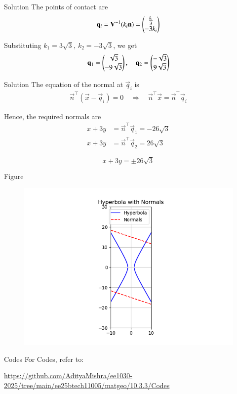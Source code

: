 \documentclass{beamer}
\begin{document}
\begin{frame}{Solution}
The points of contact are
\begin{align}
\mathbf{q}_i = \mathbf{V}^{-1} (k_i \mathbf{n})
= \begin{pmatrix}\tfrac{k_i}{3} \\ -3 k_i\end{pmatrix}
\end{align}

Substituting $k_1 = 3\sqrt{3},\ k_2 = -3\sqrt{3}$, we get
\begin{align}
\mathbf{q}_1 = \begin{pmatrix}\sqrt{3} \\ -9\sqrt{3}\end{pmatrix}, \quad
\mathbf{q}_2 = \begin{pmatrix}-\sqrt{3} \\ 9\sqrt{3}\end{pmatrix}
\end{align}
\end{frame}

\begin{frame}{Solution}
The equation of the normal at $\vec{q}_i$ is
\begin{align}
\vec{n}^\top (\vec{x} - \vec{q}_i) = 0
\quad \Rightarrow \quad
\vec{n}^\top \vec{x} = \vec{n}^\top \vec{q}_i
\end{align}

Hence, the required normals are
\begin{align}
x + 3y &= \vec{n}^\top \vec{q}_1 = -26\sqrt{3} \\
x + 3y &= \vec{n}^\top \vec{q}_2 = 26\sqrt{3}
\end{align}

\[
\boxed{x + 3y = \pm 26\sqrt{3}}
\]
\end{frame}
\begin{frame}{Figure}
\begin{figure}[h!]
    \centering
    \includegraphics[height=0.5\columnwidth, keepaspectratio]{Figs/Figure_1.png}
    \label{figure_1}
\end{figure}
\end{frame}
\begin{frame}{Codes}
	For Codes, refer to:
	
\url{https://github.com/AdityaMishra/ee1030-2025/tree/main/ee25btech11005/matgeo/10.3.3/Codes}
\end{frame}
\end{document}
